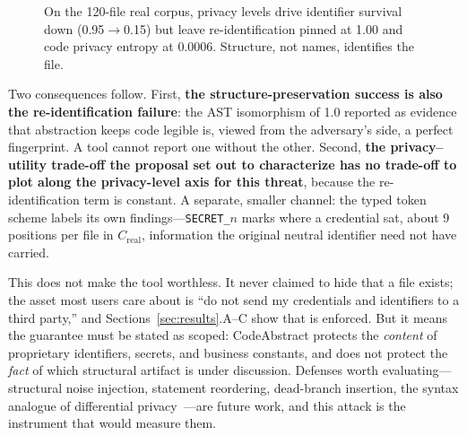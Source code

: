 \documentclass[conference]{IEEEtran}
\begin{document}
\begin{figure}[!t]
\centering
{}
\caption{On the 120-file real corpus, privacy levels drive identifier
survival down (0.95$\rightarrow$0.15) but leave re-identification pinned
at 1.00 and code privacy entropy at 0.0006. Structure, not names,
identifies the file.}
\label{fig:reident}
\end{figure}

Two consequences follow. First, \textbf{the structure-preservation
success is also the re-identification failure}: the AST isomorphism of
1.0 reported as evidence that abstraction keeps code legible is, viewed
from the adversary's side, a perfect fingerprint. A tool cannot report
one without the other. Second, \textbf{the privacy--utility trade-off the
proposal set out to characterize has no trade-off to plot along the
privacy-level axis for this threat}, because the re-identification term is
constant. A separate, smaller channel: the typed token scheme labels its
own findings---\texttt{SECRET\_}$n$ marks where a credential sat, about 9
positions per file in $C_{\text{real}}$, information the original neutral
identifier need not have carried.

This does not make the tool worthless. It never claimed to hide that a
file exists; the asset most users care about is ``do not send my
credentials and identifiers to a third party,'' and Sections~\ref{sec:results}.A--C
show that is enforced. But it means the guarantee must be stated as
scoped: CodeAbstract protects the \emph{content} of proprietary
identifiers, secrets, and business constants, and does not protect the
\emph{fact} of which structural artifact is under discussion. Defenses
worth evaluating---structural noise injection, statement reordering,
dead-branch insertion, the syntax analogue of
differential privacy~\cite{dwork2006differential}---are future work, and
this attack is the instrument that would measure them.
\end{document}
